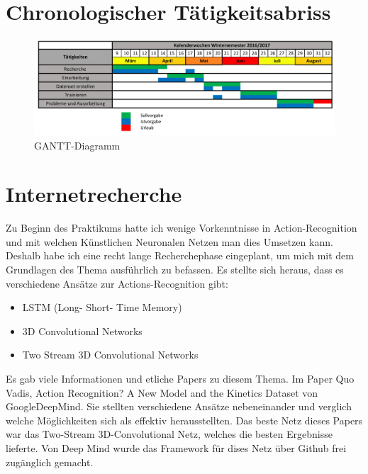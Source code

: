 \label{chap:Taetigkeitsbericht}


\section{Chronologischer Tätigkeitsabriss}
\label{sec:Chronologischer_Taetigkeitsabriss}
\begin{figure}[htb]
  \centering  
  \includegraphics[scale=0.35]{img/GANTT-Diagramm.png}
  \caption{GANTT-Diagramm \cite{Gantt}}
  \label{fig:GANTT-Diagramm}
\end{figure}


\section{Internetrecherche}
\label{sec:Recherche}
Zu Beginn des Praktikums hatte ich wenige Vorkenntnisse in Action-Recognition und mit welchen Künstlichen Neuronalen Netzen man dies Umsetzen kann. Deshalb habe ich eine recht lange Recherchephase eingeplant, um mich mit dem Grundlagen des Thema ausführlich zu befassen. Es stellte sich heraus, dass es verschiedene Ansätze zur Actions-Recognition gibt:

\begin{itemize}
\item LSTM (Long- Short- Time Memory)
\item 3D Convolutional Networks
\item Two Stream 3D Convolutional Networks
\end{itemize}

Es gab viele Informationen und etliche Papers zu diesem Thema. Im Paper Quo Vadis, Action Recognition? A New Model and the Kinetics Dataset \cite{DeepMind/i3d} von GoogleDeepMind. Sie stellten verschiedene Ansätze nebeneinander und verglich welche Möglichkeiten sich als effektiv herausstellten. Das beste Netz dieses Papers war das Two-Stream 3D-Convolutional Netz, welches die besten Ergebnisse lieferte. Von Deep Mind wurde das Framework für dises Netz über Github frei zugänglich gemacht.

